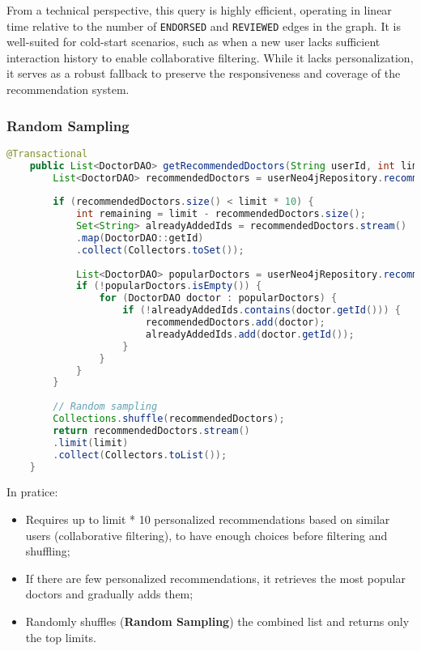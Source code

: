 From a technical perspective, this query is highly efficient, operating in linear time relative to the number of \texttt{ENDORSED} and \texttt{REVIEWED} edges in the graph. It is well-suited for cold-start scenarios, such as when a new user lacks sufficient interaction history to enable collaborative filtering. While it lacks personalization, it serves as a robust fallback to preserve the responsiveness and coverage of the recommendation system.

\subsubsection{Random Sampling}
\begin{lstlisting}[language=java, caption={Java code for the Recommendations}
	]
	@Transactional
	public List<DoctorDAO> getRecommendedDoctors(String userId, int limit) {
		List<DoctorDAO> recommendedDoctors = userNeo4jRepository.recommendDoctorsForUser(userId, limit * 10);
		
		if (recommendedDoctors.size() < limit * 10) {
			int remaining = limit - recommendedDoctors.size();
			Set<String> alreadyAddedIds = recommendedDoctors.stream()
			.map(DoctorDAO::getId)
			.collect(Collectors.toSet());
			
			List<DoctorDAO> popularDoctors = userNeo4jRepository.recommendPopularDoctors(remaining * 2);
			if (!popularDoctors.isEmpty()) {
				for (DoctorDAO doctor : popularDoctors) {
					if (!alreadyAddedIds.contains(doctor.getId())) {
						recommendedDoctors.add(doctor);
						alreadyAddedIds.add(doctor.getId());
					}
				}
			}
		}
		
		// Random sampling
		Collections.shuffle(recommendedDoctors);
		return recommendedDoctors.stream()
		.limit(limit)
		.collect(Collectors.toList());
	}
\end{lstlisting}

In pratice:
\begin{itemize}
	\item Requires up to limit * 10 personalized recommendations based on similar users (collaborative filtering), to have enough choices before filtering and shuffling;
	\item If there are few personalized recommendations, it retrieves the most popular doctors and gradually adds them;
	\item Randomly shuffles (\textbf{Random Sampling}) the combined list and returns only the top limits.
\end{itemize}

